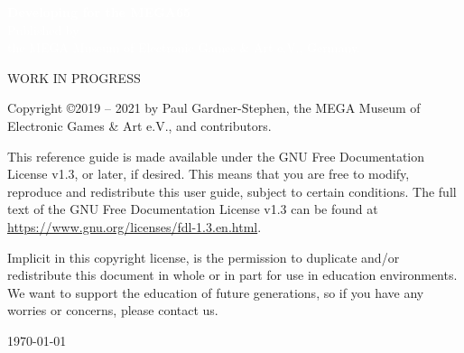 





\cleardoublepage


  \begin{titlepage}
    \pagecolor{blue}
     \begin{center}
       {
         \large
         \vspace*{2cm}
               {\Huge\textcolor{white}{\bf{Developing for the MEGA65}}}\\
             \vspace{\fill}
                    {\textcolor{white}
                    {Published by \\ the MEGA Museum of Electronic Games \& Art e.V., Germany.}}
       }
     \end{center}
   \end{titlepage}

  \pagecolor{white}\textcolor{black}
  \vfill
  WORK IN PROGRESS

  Copyright \copyright 2019 -- 2021 by Paul Gardner-Stephen,
  the MEGA Museum of Electronic Games \& Art e.V.,
  and contributors.

  This reference guide is made available under the GNU Free Documentation
  License v1.3, or later, if desired. This means that you are free to
  modify, reproduce and redistribute this user guide, subject to
  certain conditions. The full text of the GNU Free Documentation
  License v1.3 can be found at
  \url{https://www.gnu.org/licenses/fdl-1.3.en.html}.

  Implicit in this copyright license, is the permission to duplicate
  and/or redistribute this document in whole or in part for use in
  education environments. We want to support the education of future
  generations, so if you have any worries or concerns, please contact us.

   \par\today

